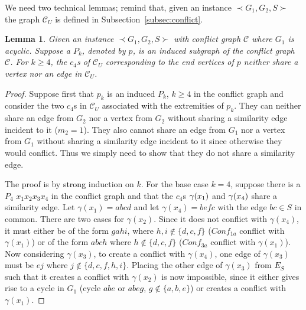 \documentclass[final]{dmtcs-episciences}
\newtheorem{lemma}[theorem]{Lemma}
\newcommand\mar[1]{\textcolor{black}{#1}}
\begin{document}
We need two technical lemmas; remind that, given an instance $\prec G_1,G_2,S \succ$ the graph  $\mathcal{C}_U$ is defined in Subsection~\ref{subsec:conflict}.  
\begin{lemma}
\label{edgesharing}
Given an instance $\prec G_1,G_2,S \succ$ with conflict graph $\mathcal{C}$ where $G_1$ is acyclic.
Suppose a $P_k$, denoted by $p$, is an induced subgraph of the conflict graph $\mathcal{C}$. For $k\geq 4$, the 
$c_4$s of $\mathcal{C}_U$ corresponding to the 
end vertices of $p$ neither share a vertex nor an edge in $\mathcal{C}_U$. 
\end{lemma}

\begin{proof}
Suppose first that $p_k$ is an induced  $P_k$, $k\geq 4$ in the conflict graph and consider the two $c_4$s in $\mathcal{C}_U$ \mar{associated with} the extremities of $p_k$. They can neither
share an edge from  $G_2$ nor a vertex from $G_2$ without sharing a similarity edge incident to it ($m_2=1$).
They also cannot share an edge from $G_1$ nor a vertex from $G_1$ without sharing a similarity edge incident to it since otherwise they would conflict.
Thus we simply need to show that they do not share 
a similarity edge.

The proof is by \mar{strong} induction on $k$. For the base case  $k=4$, suppose there is a $P_4$ \mar{$x_1x_2x_3x_4$} in the conflict graph and that 
the $c_4$s $\gamma(\mar{x_1})$ and $\gamma(\mar{x_4})$ share a similarity edge. Let $\gamma(x_1)=abcd$  and 
let $\gamma(x_4)=befc$  with the edge $bc\in S$ in common. There are two cases for 
$\gamma(x_2)$. Since it does not conflict with $\gamma(x_4)$, it  must either be of the form $gahi$, where $h,i\notin \{d,c,f\}$ ($Conf_{1a}$ conflict with $\gamma(x_1)$) or of the form $abch$ where $h\notin \{d,c,f\}$ ($Conf_{3a}$ conflict with $\gamma(x_1)$). 
Now considering $\gamma(x_3)$, to create a conflict with $\gamma(x_4)$, 
one edge of $\gamma(x_3)$ must be $ej$ where $j\notin \{d,c,f,h,i\}$. Placing the other edge of $\gamma(x_3)$ from \mar{$E_S$} such that 
it creates a conflict with $\gamma(x_2)$ is now impossible, since it either gives rise to a cycle in $G_1$ (cycle \mar{$abe$} or \mar{$abeg$}, $g\notin \{a,b,e\}$)  or creates a conflict with $\gamma(x_1)$.


\end{proof}
\end{document}
